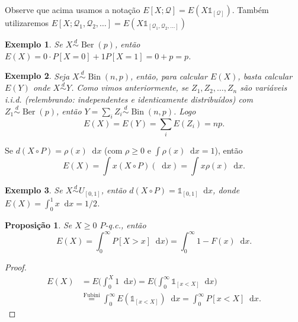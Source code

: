 \documentclass[reqno]{article}
\newcommand*\1{\mathds{1}}
\newtheorem{proposition}[theorem]{Proposição}
\DeclareMathOperator{\Ber}{Ber}
\DeclareMathOperator{\Bin}{Bin}
\newtheorem{example}{Exemplo}[section]
\renewcommand*\d{\mathop{}\!\mathrm{d}}
\begin{document}
Observe que acima usamos a notação $E[X; \mathcal{Q}] = E(X \1_{[\mathcal{Q}]})$.
Também utilizaremos $E[X; \mathcal{Q}_1, \mathcal{Q}_2, \dots] = E(X \1_{[\mathcal{Q}_1, \mathcal{Q}_2, \dots]})$

\begin{example}
  Se $X \overset{d}\sim \Ber(p)$, então $E(X) = 0 \cdot P[X = 0] + 1 P[X = 1] = 0 + p = p$.
\end{example}

\begin{example}
  Seja $X \overset{d}\sim \Bin(n,p)$, então, para calcular $E(X)$, basta calcular $E(Y)$ onde $X \overset{d}\sim Y$.
  Como vimos anteriormente, se $Z_1, Z_2, \dots, Z_n$ são variáveis i.i.d. (relembrando: independentes e identicamente distribuídos) com $Z_1 \overset{d}\sim \Ber(p)$, então $Y = \sum_i Z_i \overset{d}\sim \Bin(n,p)$.
  Logo
  \begin{equation}
    E(X) = E(Y) = \sum_i E(Z_i) = n p.
  \end{equation}
\end{example}

Se $d(X \circ P) = \rho(x) \d x$ (com $\rho \geq 0$ e $\int \rho(x) \d x = 1$), então
\begin{equation}
  E(X) = \int x (X \circ P)(\d x) = \int x \rho(x) \d x.
\end{equation}

\begin{example}
  Se $X \overset{d}\sim U_{[0,1]}$, então $d(X \circ P) = \1_{[0,1]} \d x$, donde $E(X) = \int_0^1 x \d x = 1/2$.
\end{example}

\begin{proposition}
  \label{p:espera_acumulada}
  Se $X \geq 0$ $P$-q.c., então
  \begin{equation}
    E(X) = \int_0^\infty P[X > x] \d x) = \int_0^\infty 1 - F(x) \d x.
  \end{equation}
\end{proposition}

\begin{proof}
  \begin{equation}
    \begin{split}
      E(X) & = E \Big( \int_0^X 1 \d x \Big) = E \Big( \int_0^\infty \1_{[x < X]} \d x \Big)\\
      & \overset{\text{Fubini}}= \int_0^\infty E(\1_{[x < X]}) \d x = \int_0^\infty P[x < X] \d x.
    \end{split}
  \end{equation}
\end{proof}
\end{document}
